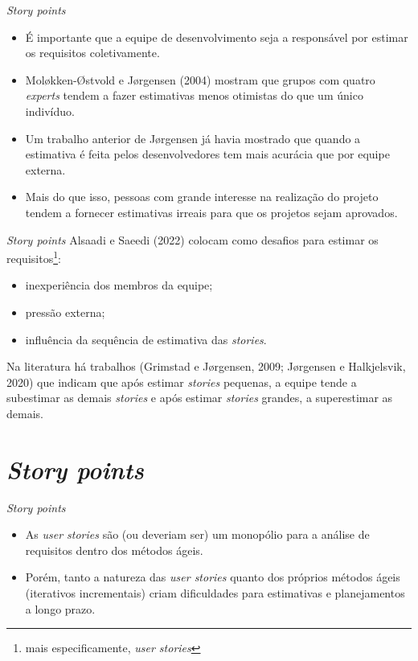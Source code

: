 \documentclass[11pt]{beamer}
\begin{document}
    \begin{frame}{\textit{Story points}}
        \begin{itemize}
            \item É importante que a equipe de desenvolvimento seja a responsável por estimar os requisitos coletivamente.
            \item Mol\o{}kken-\O{}stvold e J\o{}rgensen (2004) mostram que grupos com quatro \textit{experts} tendem a fazer estimativas menos otimistas do que um único indivíduo.
            \item Um trabalho anterior de J\o{}rgensen já havia mostrado que quando a estimativa é feita pelos desenvolvedores tem mais acurácia que por equipe externa.
            \item Mais do que isso, pessoas com grande interesse na realização do projeto tendem a fornecer estimativas irreais para que os projetos sejam aprovados.
        \end{itemize}
    \end{frame}

    \begin{frame}{\textit{Story points}}
        Alsaadi e Saeedi (2022) colocam como desafios para estimar os requisitos\footnote{mais especificamente, \textit{user stories}}:
        \begin{itemize}
            \item inexperiência dos membros da equipe;
            \item pressão externa;
            \item influência da sequência de estimativa das \textit{stories}.
        \end{itemize}
        Na literatura há trabalhos (Grimstad e J\o{}rgensen, 2009; J\o{}rgensen e Halkjelsvik, 2020) que indicam que após estimar \textit{stories} pequenas, a equipe tende a subestimar as demais \textit{stories} e após estimar \textit{stories} grandes, a superestimar as demais. 
    \end{frame}

    \section{\textit{Story points}}

    \begin{frame}{\textit{Story points}}
        \begin{itemize}
            \item As \textit{user stories} são (ou deveriam ser) um monopólio para a análise de requisitos dentro dos métodos ágeis.
            \item Porém, tanto a natureza das \textit{user stories} quanto dos próprios métodos ágeis (iterativos incrementais) criam dificuldades para estimativas e planejamentos a longo prazo.
        \end{itemize}
    \end{frame}
\end{document}
